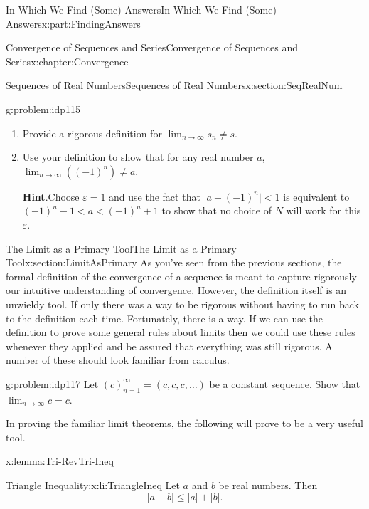 \documentclass[oneside,10pt,]{book}
\newcommand{\blocktitlefont}{\relax}
\numberwithin{equation}{section}
\def\limit#1#2#3{{\displaystyle\lim_{#1\rightarrow #2}#3}}
\newcommand{\eps}{\varepsilon}
\newcommand{\lt}{<}
\begin{document}
\begin{partptx}{In Which We Find (Some) Answers}{}{In Which We Find (Some) Answers}{}{}{x:part:FindingAnswers}
\begin{chapterptx}{Convergence of Sequences and Series}{}{Convergence of Sequences and Series}{}{}{x:chapter:Convergence}
\begin{sectionptx}{Sequences of Real Numbers}{}{Sequences of Real Numbers}{}{}{x:section:SeqRealNum}
\begin{problem}{}{g:problem:idp115}
\begin{enumerate}[font=\bfseries,label=(\alph*),ref=\alph*]
\item{}Provide a rigorous definition for \(\limit{n}{\infty}{s_n}\neq s\).%
\item{}Use your definition to show that for any real number \(a\), \(\limit{n}{\infty}{\left(\left(-1\right)^n\right)}\neq a\).%
\par\smallskip%
\noindent\textbf{\blocktitlefont Hint}.\hypertarget{g:hint:idp116}{}\quad{}Choose \(\eps=1\) and use the fact that \(\Big|a-(-1)^n\Big|\lt 1\) is equivalent to \(\left(-1\right)^n-1\lt a\lt \left(-1\right)^n+1\) to show that no choice of \(N\) will work for this \(\eps\).%
\end{enumerate}
\end{problem}
\end{sectionptx}
%
%
\typeout{************************************************}
\typeout{************************************************}
%
\begin{sectionptx}{The Limit as a Primary Tool}{}{The Limit as a Primary Tool}{}{}{x:section:LimitAsPrimary}
As you've seen from the previous sections, the formal definition of the convergence of a sequence is meant to capture rigorously our intuitive understanding of convergence. However, the definition itself is an unwieldy tool. If only there was a way to be rigorous without having to run back to the definition each time. Fortunately, there is a way. If we can use the definition to prove some general rules about limits then we could use these rules whenever they applied and be assured that everything was still rigorous. A number of these should look familiar from calculus.%
\begin{problem}{}{g:problem:idp117}%
 Let \(\left(c\right)_{n=1}^\infty=(c,c,c,\ldots)\) be a constant sequence. Show that \(\lim_{n\rightarrow\infty}c=c\).%
\end{problem}
In proving the familiar limit theorems, the following will prove to be a very useful tool.%
\begin{lemma}{}{}{x:lemma:Tri-RevTri-Ineq}%
%
%
\begin{descriptionlist}
\begin{dlimedium}{Triangle Inequality:}{x:li:TriangleIneq}%
Let \(a\) and \(b\) be real numbers. Then%
\begin{equation*}
|a+b|\leq|a|+|b|\text{.}
\end{equation*}

\end{dlimedium}
\end{descriptionlist}
\end{lemma}
\end{sectionptx}
\end{chapterptx}
\end{partptx}
\end{document}
